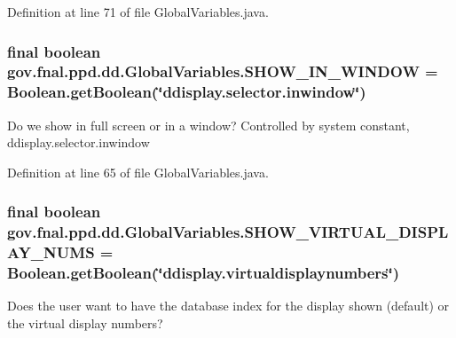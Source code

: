 Definition at line 71 of file Global\-Variables.\-java.

\hypertarget{classgov_1_1fnal_1_1ppd_1_1dd_1_1GlobalVariables_af0e7b37c8bf6495b999b93ed0f4f1c76}{
\subsubsection[{S\-H\-O\-W\-\_\-\-I\-N\-\_\-\-W\-I\-N\-D\-O\-W}]{\setlength{\rightskip}{0pt plus 5cm}final boolean gov.\-fnal.\-ppd.\-dd.\-Global\-Variables.\-S\-H\-O\-W\-\_\-\-I\-N\-\_\-\-W\-I\-N\-D\-O\-W = Boolean.\-get\-Boolean(\char`\"{}ddisplay.\-selector.\-inwindow\char`\"{})\hspace{0.3cm}{\ttfamily [static]}}}\label{classgov_1_1fnal_1_1ppd_1_1dd_1_1GlobalVariables_af0e7b37c8bf6495b999b93ed0f4f1c76}
Do we show in full screen or in a window? Controlled by system constant, ddisplay.\-selector.\-inwindow 

Definition at line 65 of file Global\-Variables.\-java.

\hypertarget{classgov_1_1fnal_1_1ppd_1_1dd_1_1GlobalVariables_a7ccfa5abda77efe03cd888f14d4171a3}{
\subsubsection[{S\-H\-O\-W\-\_\-\-V\-I\-R\-T\-U\-A\-L\-\_\-\-D\-I\-S\-P\-L\-A\-Y\-\_\-\-N\-U\-M\-S}]{\setlength{\rightskip}{0pt plus 5cm}final boolean gov.\-fnal.\-ppd.\-dd.\-Global\-Variables.\-S\-H\-O\-W\-\_\-\-V\-I\-R\-T\-U\-A\-L\-\_\-\-D\-I\-S\-P\-L\-A\-Y\-\_\-\-N\-U\-M\-S = Boolean.\-get\-Boolean(\char`\"{}ddisplay.\-virtualdisplaynumbers\char`\"{})\hspace{0.3cm}{\ttfamily [static]}}}\label{classgov_1_1fnal_1_1ppd_1_1dd_1_1GlobalVariables_a7ccfa5abda77efe03cd888f14d4171a3}
Does the user want to have the database index for the display shown (default) or the virtual display numbers? 

